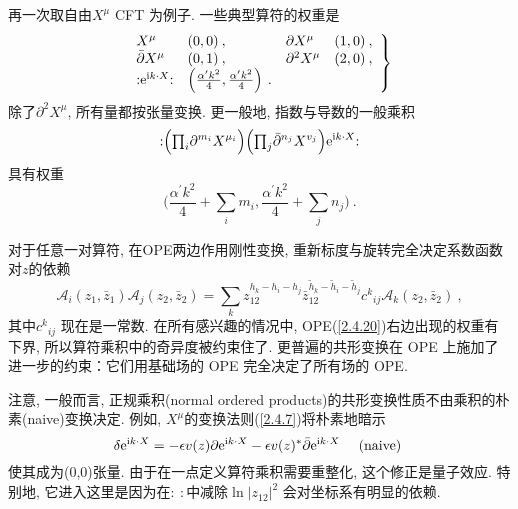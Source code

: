再一次取自由$X^\mu$ CFT 为例子. 一些典型算符的权重是
\begin{equation}
\left.\begin{array}{llll}
X^{\mu} & (0,0) \:, & \partial X^{\mu} & (1,0) \:, \\
\bar{\partial} X^{\mu} & (0,1) \:, & \partial^{2} X^{\mu} & (2,0)  \:,\\
: \mathrel{\mathrm{e}^{\mathrm{i} k \cdot X}}: & \left(\frac{\alpha^{\prime} k^{2}}{4}, \frac{\alpha^{\prime} k^{2}}{4}\right) \:. & &
\end{array}\right\} \label{2.4.17}
\end{equation}
除了$\partial^{2} X^{\mu}$, 所有量都按张量变换. 更一般地, 指数与导数的一般乘积
\begin{equation}
:\mathrel{\Bigl({\textstyle \prod_{i}} \partial^{m_{i}} X^{\mu_{i}}\Bigr)\Bigl({\textstyle \prod_{j}} \bar{\partial}^{n_{j}} X^{v_{j}}\Bigr) \mathrm{e}^{\mathrm{i} k \cdot X} }:
\end{equation}
具有权重
\begin{equation}
\biggl(\frac{\alpha^{\prime} k^{2}}{4}+ {\textstyle\sum_{i}} m_{i}, \frac{\alpha^{\prime} k^{2}}{4}+\textstyle{\sum_{j}} n_{j}\biggr) \:. \label{2.4.19}
\end{equation}

对于任意一对算符, 在OPE两边作用刚性变换, 重新标度与旋转完全决定系数函数对$z$的依赖
\begin{equation}\label{2.4.20}
\mathscr{A}_{i}(z_{1}, \bar{z}_{1}) \mathscr{A}_{j}(z_{2}, \bar{z}_{2})=\sum_{k} z_{12}^{h_{k}-h_{i}-h_{j}} 
\bar{z}_{12}^{\tilde{h}_{k}-\tilde{h}_{i}-\tilde{h}_{j}} c^{k}{}_{i j} \mathscr{A}_{k}(z_{2}, \bar{z}_{2}) \:,
\end{equation}
其中$c^k{}_{ij}$ 现在是一常数. 在所有感兴趣的情况中, OPE(\ref{2.4.20})右边出现的权重有下界, 所以算符乘积中的奇异度被约束住了. 更普遍的共形变换在 OPE 上施加了进一步的约束：它们用基础场的 OPE 完全决定了所有场的 OPE.

注意, 一般而言, 正规乘积(normal ordered
products)的共形变换性质不由乘积的朴素(naive)变换决定. 例如, $X^\mu$的变换法则(\ref{2.4.7})将朴素地暗示
\begin{equation}
\delta \mathrm{e}^{\mathrm{i} k \cdot X}=-\epsilon v(z) \partial \mathrm{e}^{\mathrm{i} k \cdot X}-\epsilon v(z)^{*} \bar{\partial} \mathrm{e}^{\mathrm{i} k \cdot X} \quad \text { (naive) }
\end{equation}
使其成为(0,0)张量. 由于在一点定义算符乘积需要重整化, 这个修正是量子效应. 特别地, 它进入这里是因为在$\mathrel{:\::}$中减除$\ln \lvert z_{12}\rvert^{2}$ 会对坐标系有明显的依赖. 

